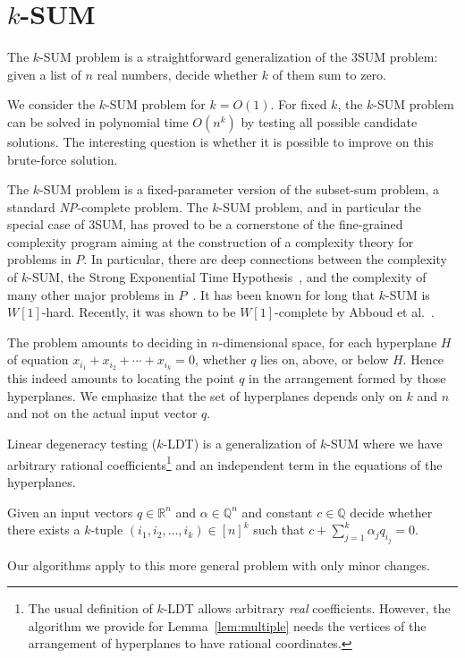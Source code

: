 \chapter{\(k\)-SUM}

The \(k\)-SUM problem is a straightforward generalization of the 3SUM problem:
given a list of \(n\) real numbers, decide whether \(k\) of them sum to zero.



We consider the \(k\)-SUM problem for \(k=O(1)\).
For fixed \(k\), the \(k\)-SUM problem can be solved in polynomial time
\(O(n^k)\) by testing all possible candidate solutions.
The interesting question is whether it is possible to improve on
this brute-force solution.

The \(k\)-SUM problem is a fixed-parameter version of the subset-sum problem, a
standard \textit{NP}-complete problem. The \(k\)-SUM problem, and in particular
the special case of 3SUM, has proved to be a cornerstone of the fine-grained
complexity program aiming at the construction of a complexity theory for
problems in $P$. In particular, there are deep connections between the
complexity of \(k\)-SUM, the Strong Exponential Time
Hypothesis~\cite{PW10,CGIMPS15}, and the complexity of many other major
problems in
$P$~\cite{GO95,BH99,MO01,P10,ACLL14,AVW14,GP18,KPP14,ALW14,AWY15,CL15}.
It has been known for long that \(k\)-SUM is $W[1]$-hard. Recently, it was shown
to be $W[1]$-complete by Abboud et al.~\cite{ALW14}.

The problem amounts to deciding in $n$-dimensional space, for each hyperplane
\(H\) of equation \(x_{i_1} + x_{i_2} + \cdots +x_{i_k} = 0\), whether \(q\)
lies on, above, or below \(H\). Hence this indeed amounts to locating the point
$q$ in the arrangement formed by those hyperplanes. We emphasize that the set
of hyperplanes depends only on $k$ and $n$ and not on the actual input vector
$q$.

Linear degeneracy testing (\(k\)-LDT) is a generalization of \(k\)-SUM where we
have arbitrary rational coefficients\footnote{The usual definition of \(k\)-LDT
allows arbitrary \emph{real} coefficients. However, the algorithm we provide
for Lemma~\ref{lem:multiple} needs the vertices of the arrangement of
hyperplanes to have rational coordinates.}
and an independent term in the equations
of the hyperplanes.
\begin{problem}[\(k\)-LDT]
 Given an input vectors \(q\in\mathbb{R}^n\) and
 $\alpha \in \mathbb{Q}^n$ and constant $c \in \mathbb{Q}$
 decide whether there exists a
 $k$-tuple \((i_1, i_2,\ldots ,i_k) \in {[n]}^k\) such that
 \(c + \sum_{j=1}^k \alpha_j q_{i_j} = 0\).
 \end{problem}
Our algorithms apply to this more general problem with only minor changes.

